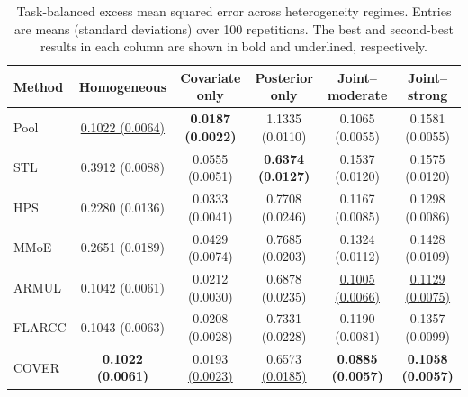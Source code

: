 \begin{table}[t]
\centering
\footnotesize
\setlength{\tabcolsep}{3.2pt}
\begin{tabular}{lccccc}
\toprule
Method & Homogeneous & Covariate only & Posterior only & Joint--moderate & Joint--strong \\
\midrule
Pool & \underline{0.1022 (0.0064)} & \textbf{0.0187 (0.0022)} & 1.1335 (0.0110) & 0.1065 (0.0055) & 0.1581 (0.0055) \\
STL & 0.3912 (0.0088) & 0.0555 (0.0051) & \textbf{0.6374 (0.0127)} & 0.1537 (0.0120) & 0.1575 (0.0120) \\
HPS & 0.2280 (0.0136) & 0.0333 (0.0041) & 0.7708 (0.0246) & 0.1167 (0.0085) & 0.1298 (0.0086) \\
MMoE & 0.2651 (0.0189) & 0.0429 (0.0074) & 0.7685 (0.0203) & 0.1324 (0.0112) & 0.1428 (0.0109) \\
ARMUL & 0.1042 (0.0061) & 0.0212 (0.0030) & 0.6878 (0.0235) & \underline{0.1005 (0.0066)} & \underline{0.1129 (0.0075)} \\
FLARCC & 0.1043 (0.0063) & 0.0208 (0.0028) & 0.7331 (0.0228) & 0.1190 (0.0081) & 0.1357 (0.0099) \\
COVER & \textbf{0.1022 (0.0061)} & \underline{0.0193 (0.0023)} & \underline{0.6573 (0.0185)} & \textbf{0.0885 (0.0057)} & \textbf{0.1058 (0.0057)} \\
\bottomrule
\end{tabular}
\caption{Task-balanced excess mean squared error across heterogeneity regimes. Entries are means (standard deviations) over 100 repetitions. The best and second-best results in each column are shown in bold and underlined, respectively.}
\label{tab:simulation-main}
\end{table}
